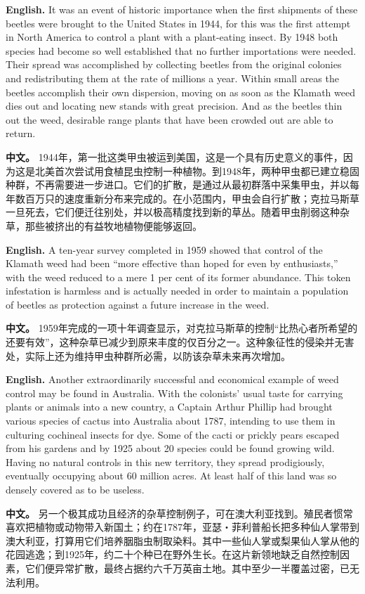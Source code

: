 \noindent\textbf{English.} It was an event of historic importance when the first shipments of these beetles were brought to the United States in 1944, for this was the first attempt in North America to control a plant with a plant-eating insect. By 1948 both species had become so well established that no further importations were needed. Their spread was accomplished by collecting beetles from the original colonies and redistributing them at the rate of millions a year. Within small areas the beetles accomplish their own dispersion, moving on as soon as the Klamath weed dies out and locating new stands with great precision. And as the beetles thin out the weed, desirable range plants that have been crowded out are able to return.
\par
\noindent\textbf{中文。} 1944年，第一批这类甲虫被运到美国，这是一个具有历史意义的事件，因为这是北美首次尝试用食植昆虫控制一种植物。到1948年，两种甲虫都已建立稳固种群，不再需要进一步进口。它们的扩散，是通过从最初群落中采集甲虫，并以每年数百万只的速度重新分布来完成的。在小范围内，甲虫会自行扩散；克拉马斯草一旦死去，它们便迁往别处，并以极高精度找到新的草丛。随着甲虫削弱这种杂草，那些被挤出的有益牧地植物便能够返回。
\par\medskip

\noindent\textbf{English.} A ten-year survey completed in 1959 showed that control of the Klamath weed had been ``more effective than hoped for even by enthusiasts,'' with the weed reduced to a mere 1 per cent of its former abundance. This token infestation is harmless and is actually needed in order to maintain a population of beetles as protection against a future increase in the weed.
\par
\noindent\textbf{中文。} 1959年完成的一项十年调查显示，对克拉马斯草的控制“比热心者所希望的还要有效”，这种杂草已减少到原来丰度的仅百分之一。这种象征性的侵染并无害处，实际上还为维持甲虫种群所必需，以防该杂草未来再次增加。
\par\medskip

\noindent\textbf{English.} Another extraordinarily successful and economical example of weed control may be found in Australia. With the colonists' usual taste for carrying plants or animals into a new country, a Captain Arthur Phillip had brought various species of cactus into Australia about 1787, intending to use them in culturing cochineal insects for dye. Some of the cacti or prickly pears escaped from his gardens and by 1925 about 20 species could be found growing wild. Having no natural controls in this new territory, they spread prodigiously, eventually occupying about 60 million acres. At least half of this land was so densely covered as to be useless.
\par
\noindent\textbf{中文。} 另一个极其成功且经济的杂草控制例子，可在澳大利亚找到。殖民者惯常喜欢把植物或动物带入新国土；约在1787年，亚瑟・菲利普船长把多种仙人掌带到澳大利亚，打算用它们培养胭脂虫制取染料。其中一些仙人掌或梨果仙人掌从他的花园逃逸；到1925年，约二十个种已在野外生长。在这片新领地缺乏自然控制因素，它们便异常扩散，最终占据约六千万英亩土地。其中至少一半覆盖过密，已无法利用。
\par\medskip


